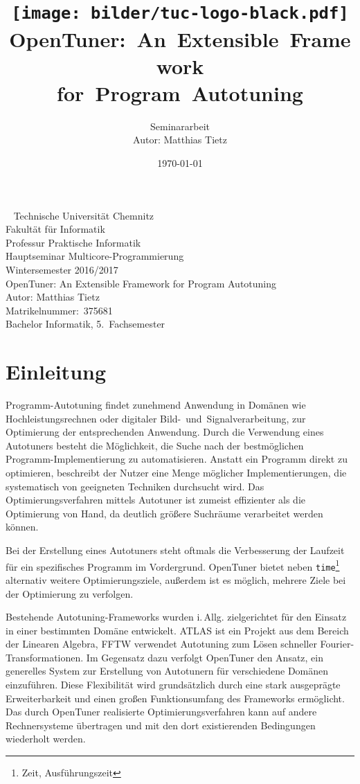 \documentclass[a4paper,11pt]{scrartcl}
\title{\texttt{[image: bilder/tuc-logo-black.pdf]}
    OpenTuner:~An~Extensible~Framework\\for~Program~Autotuning
}
\author{Seminararbeit\\Autor: Matthias Tietz}
\date{\today}
\newcommand{\iAllg}{\mbox{i.\,Allg.}\xspace}
\begin{document}
\maketitle \thispagestyle{empty} \newpage

\thispagestyle{empty}
~
\vfill
Technische Universität Chemnitz\\
Fakultät für Informatik\\
Professur Praktische Informatik\\
Hauptseminar Multicore-Programmierung\\
Wintersemester 2016/2017\\

OpenTuner: An Extensible Framework for Program Autotuning\\
Autor: Matthias Tietz\\
Matrikelnummer:~375681\\
Bachelor Informatik, 5.~Fachsemester

\newpage
\tableofcontents \newpage



\section{Einleitung}

Programm-Autotuning findet zunehmend Anwendung in Domänen wie Hochleistungsrechnen oder
digitaler Bild-~und~Signalverarbeitung, zur Optimierung der entsprechenden Anwendung.
Durch die Verwendung eines Autotuners besteht die Möglichkeit, die Suche nach der
bestmöglichen Programm-Implementierung zu automatisieren. Anstatt ein Programm direkt
zu optimieren, beschreibt der Nutzer eine Menge möglicher Implementierungen, die 
systematisch von geeigneten Techniken durchsucht wird. Das Optimierungsverfahren
mittels Autotuner ist zumeist effizienter als die Optimierung von Hand, da deutlich größere
Suchräume verarbeitet werden können. \newline

Bei der Erstellung eines Autotuners steht oftmals die Verbesserung der Laufzeit
für ein spezifisches Programm im Vordergrund. OpenTuner bietet neben \texttt{time}\footnote{Zeit, Ausführungszeit}  
alternativ weitere Optimierungsziele, außerdem ist es möglich, mehrere Ziele bei der Optimierung 
zu verfolgen. \newline


Bestehende Autotuning-Frameworks wurden \iAllg zielgerichtet für den Einsatz in einer 
bestimmten Domäne entwickelt. \textsc{ATLAS} \cite{atlas} ist ein Projekt aus dem Bereich der Linearen Algebra,
\textsc{FFTW} \cite{fftw} verwendet Autotuning zum Lösen schneller Fourier-Transformationen.
Im Gegensatz dazu verfolgt OpenTuner den Ansatz, ein generelles System zur Erstellung 
von Autotunern für verschiedene Domänen einzuführen. Diese Flexibilität wird grundsätzlich durch eine stark
ausgeprägte Erweiterbarkeit und einen großen Funktionsumfang des Frameworks ermöglicht.
Das durch OpenTuner realisierte Optimierungsverfahren kann auf andere Rechnersysteme übertragen
und mit den dort existierenden Bedingungen wiederholt werden. \newline
\end{document}
